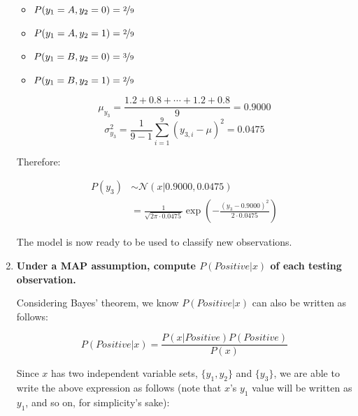\documentclass[12pt]{article}
\begin{document}
\begin{enumerate}[leftmargin=\labelsep]
        \begin{multicols}{2}
          \setlength{\columnseprule}{1pt}
          \def\columnseprulecolor{\color{black}}

          \centering

          \begin{itemize}
            \item $P(y_1 = A, y_2 = 0) = \nicefrac{2}{9}$
            \item $P(y_1 = A, y_2 = 1) = \nicefrac{2}{9}$
            \item $P(y_1 = B, y_2 = 0) = \nicefrac{3}{9}$
            \item $P(y_1 = B, y_2 = 1) = \nicefrac{2}{9}$
          \end{itemize}

          \columnbreak

          $$
            \mu_{y_3} = \frac{1.2 + 0.8 + \cdots + 1.2 + 0.8}{9} = 0.9000
          $$
          $$
            \sigma_{y_3}^2 = \frac{1}{9 - 1} \sum_{i=1}^{9} (y_{3, i} - \mu)^2 = 0.0475
          $$

          Therefore:

          \vspace{-1cm}

          \begin{align*}
            P(y_3) & \sim \mathcal{N}(x | 0.9000, 0.0475)                                                                \\
                   & = \frac{1}{\sqrt{2 \pi \cdot 0.0475}} \exp \left( - \frac{(y_3 - 0.9000)^2}{2 \cdot 0.0475} \right)
          \end{align*}

        \end{multicols}

        The model is now ready to be used to classify new observations.

        \pagebreak

  \item \textbf{Under a MAP assumption, compute $P(Positive | x)$ of each testing observation.}

        Considering Bayes' theorem, we know $P(Positive | x)$ can also be written as follows:

        $$
          P(Positive | x) = \frac{P(x | Positive) P(Positive)}{P(x)}
        $$

        Since $x$ has two independent variable sets, $\{y_1, y_2\}$ and $\{y_3\}$, we are
        able to write the above expression as follows (note that $x$'s $y_1$ value will
        be written as $y_1$, and so on, for simplicity's sake):


\end{enumerate}
\end{document}
